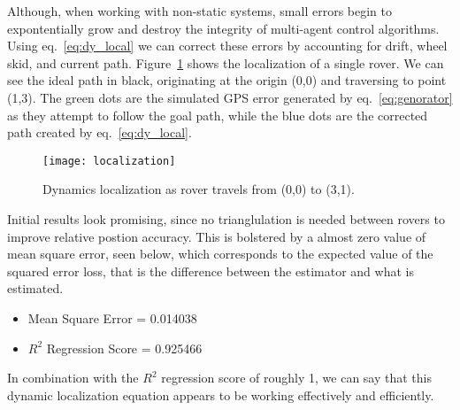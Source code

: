 Although, when working with non-static systems, small errors begin to expontentially grow and destroy the integrity of multi-agent control algorithms. Using eq.~\ref{eq:dy_local} we can correct these errors by accounting for drift, wheel skid, and current path. Figure~\ref{fig:dynamic} shows the localization of a single rover. We can see the ideal path  in black, originating at the origin (0,0) and traversing to point (1,3). The green dots are the simulated GPS error generated by eq.~\ref{eq:genorator} as they attempt to follow the goal path, while the blue dots are the corrected path created by eq.~\ref{eq:dy_local}.

\begin{figure} 
	\centering
	\texttt{[image: localization]}
	\caption{Dynamics localization as rover travels from (0,0) to (3,1).}
	\label{fig:dynamic}
\end{figure}

Initial results look promising, since no trianglulation is needed between rovers to improve relative postion accuracy. This is bolstered by a almost zero value of mean square error, seen below, which corresponds to the expected value of the squared error loss, that is the difference between the estimator and what is estimated. 

\begin{itemize}
	\item Mean Square Error = 0.014038
	\item $R^2$ Regression Score = 0.925466
\end{itemize}

In combination with the $R^2$ regression score of roughly 1, we can say that this dynamic localization equation appears to be working effectively and efficiently. 
